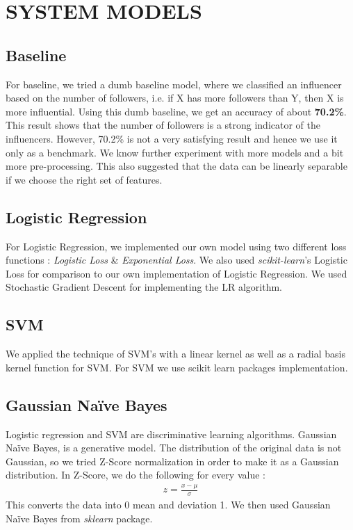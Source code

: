 \documentclass[conference]{IEEEtran}
\numberwithin{equation}{section}
\numberwithin{figure}{section}
\numberwithin{table}{section}
\begin{document}
\section{SYSTEM MODELS
}\label{sec:fig-tables}
\subsection{Baseline}\label{sec:cap-num}
For baseline, we tried a dumb baseline model, where we classified an influencer based on the number of followers, i.e. if X has more followers than Y, then X is more influential. Using this dumb baseline, we get an accuracy of about \textbf{70.2\%}. This result shows
that the number of followers is a strong indicator
of the influencers. However, 70.2\% is not a very satisfying result and hence we use it only as a benchmark. We know further experiment with more models and a bit more pre-processing. This also suggested that the data can be linearly separable if we choose the right set of features.

\subsection{Logistic Regression}\label{sec:colour-illustrations}
For Logistic Regression, we implemented our own model using two different loss functions : \textit{Logistic Loss} \& \textit{Exponential Loss}. We also used \textit{scikit-learn}'s Logistic Loss for comparison to our own implementation of Logistic Regression. We used Stochastic Gradient Descent for implementing the LR algorithm.

\subsection{SVM}\label{sec:colour-illustrations}
We applied the technique of SVM's with a linear kernel as well as a radial basis kernel function for SVM. For SVM we use scikit learn packages implementation. \cite{svm}

\subsection{Gaussian Na{\"i}ve Bayes}\label{sec:colour-illustrations}
Logistic regression and SVM are discriminative learning algorithms. Gaussian Na{\"i}ve Bayes, is a generative model. The distribution of the original data is not Gaussian, so we tried Z-Score normalization in order to make it as a Gaussian distribution. In Z-Score, we do the following for every value : 
\begin{align*}
z = \frac{x - \mu}{\sigma}
\end{align*}
This converts the data into 0 mean and deviation 1. We then used Gaussian Na{\"i}ve Bayes from \textit{sklearn} package. \cite{gnb}
\end{document}
